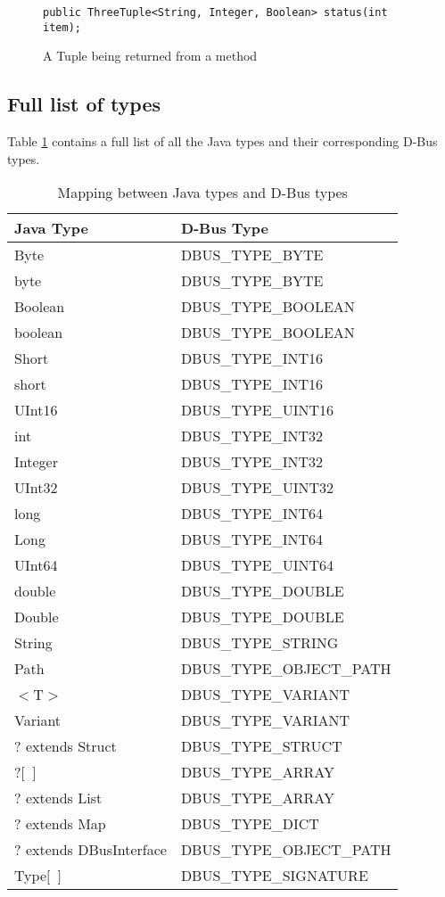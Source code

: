 \documentclass[a4paper,12pt]{article}
\begin{document}
\begin{figure}[htb]
\begin{center}
\begin{verbatim}
public ThreeTuple<String, Integer, Boolean> status(int item);
\end{verbatim}
\end{center}
\caption{A Tuple being returned from a method}
\label{fig:tuplemethod}
\end{figure}

\subsection{Full list of types}

Table \ref{table:types} contains a full list of all the Java types and their corresponding D-Bus types.

\begin{table}
\begin{center}
\begin{tabular}{l|l}
\bf Java Type & \bf D-Bus Type \\
\hline
Byte	&	DBUS\_TYPE\_BYTE	\\
byte	&	DBUS\_TYPE\_BYTE	\\
Boolean	&	DBUS\_TYPE\_BOOLEAN	\\
boolean	&	DBUS\_TYPE\_BOOLEAN	\\
Short	&	DBUS\_TYPE\_INT16	\\
short	&	DBUS\_TYPE\_INT16	\\
UInt16	&	DBUS\_TYPE\_UINT16	\\
int	&	DBUS\_TYPE\_INT32	\\
Integer	&	DBUS\_TYPE\_INT32	\\
UInt32	&	DBUS\_TYPE\_UINT32	\\
long	&	DBUS\_TYPE\_INT64	\\
Long	&	DBUS\_TYPE\_INT64	\\
UInt64	&	DBUS\_TYPE\_UINT64	\\
double	&	DBUS\_TYPE\_DOUBLE	\\
Double	&	DBUS\_TYPE\_DOUBLE	\\
String	&	DBUS\_TYPE\_STRING	\\
Path	&	DBUS\_TYPE\_OBJECT\_PATH	\\
$<$T$>$	&	DBUS\_TYPE\_VARIANT	\\
Variant	&	DBUS\_TYPE\_VARIANT	\\
? extends Struct	&	DBUS\_TYPE\_STRUCT	\\
?$[$~$]$	&	DBUS\_TYPE\_ARRAY	\\
? extends List	&	DBUS\_TYPE\_ARRAY	\\
? extends Map	&	DBUS\_TYPE\_DICT	\\
? extends DBusInterface	&	DBUS\_TYPE\_OBJECT\_PATH	\\
Type$[$~$]$	&	DBUS\_TYPE\_SIGNATURE	\\
\end{tabular}
\end{center}
\caption{Mapping between Java types and D-Bus types}
\label{table:types}
\end{table}
\end{document}
